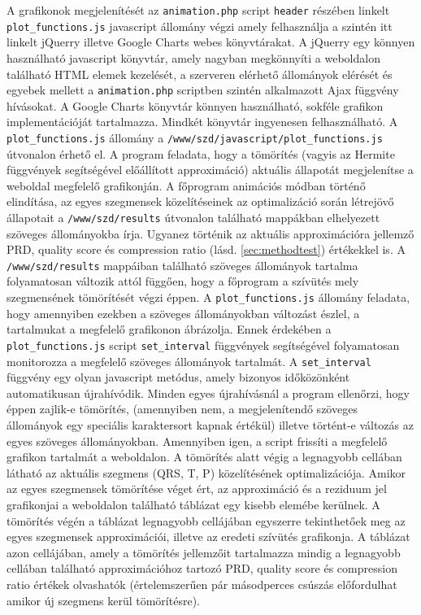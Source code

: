 \documentclass[oneside,titlepage,12pt,a4paper]{report}
\begin{document}
\par A grafikonok megjelenítését az \texttt{animation.php} script \texttt{header} részében linkelt \texttt{plot\_functions.js} javascript állomány végzi amely felhasználja a szintén itt linkelt jQuerry \cite{jquerry} illetve Google Charts \cite{gchart} webes könyvtárakat. A jQuerry egy könnyen használható javascript könyvtár, amely nagyban megkönnyíti a weboldalon található HTML elemek kezelését, a szerveren elérhető állományok elérését és egyebek mellett a \texttt{animation.php} scriptben szintén alkalmazott Ajax függvény hívásokat. A Google Charts könyvtár könnyen használható, sokféle grafikon implementációját tartalmazza. Mindkét könyvtár ingyenesen felhasználható. A \texttt{plot\_functions.js} állomány a \texttt{/www/szd/javascript/plot\_functions.js} útvonalon érhető el. A program feladata, hogy a tömörítés (vagyis az Hermite függvények segítségével előállított approximáció) aktuális állapotát megjelenítse a weboldal megfelelő grafikonján. A főprogram animációs módban történő elindítása, az egyes szegmensek közelítéseinek az optimalizáció során létrejövő állapotait a \texttt{/www/szd/results} útvonalon található mappákban elhelyezett szöveges állományokba írja. Ugyanez történik az aktuális approximációra jellemző PRD, quality score és compression ratio (lásd. \ref{sec:methodtest}) értékekkel is. A \texttt{/www/szd/results} mappáiban található szöveges állományok tartalma folyamatosan változik attól függően, hogy a főprogram a szívütés mely szegmensének tömörítését végzi éppen. A \texttt{plot\_functions.js} állomány feladata, hogy amennyiben ezekben a szöveges állományokban változást észlel, a tartalmukat  a megfelelő grafikonon ábrázolja. Ennek érdekében a \texttt{plot\_functions.js} script \texttt{set\_interval} függvények segítségével folyamatosan monitorozza a megfelelő szöveges állományok tartalmát. A \texttt{set\_interval} függvény egy olyan javascript metódus, amely bizonyos időközönként automatikusan újrahívódik. Minden egyes újrahívásnál a program ellenőrzi, hogy éppen zajlik-e tömörítés, (amennyiben nem, a megjelenítendő szöveges állományok egy speciális karaktersort kapnak értékül) illetve történt-e változás az egyes szöveges állományokban. Amennyiben igen, a script frissíti a megfelelő grafikon tartalmát a weboldalon. A tömörítés alatt végig a legnagyobb cellában látható az aktuális szegmens (QRS, T, P) közelítésének optimalizációja. Amikor az egyes szegmensek tömörítése véget ért, az approximáció és a reziduum jel grafikonjai a weboldalon található táblázat egy kisebb elemébe kerülnek. A tömörítés végén a táblázat legnagyobb cellájában egyszerre tekinthetőek meg az egyes szegmensek approximációi, illetve az eredeti szívütés grafikonja. A táblázat azon cellájában, amely a tömörítés jellemzőit tartalmazza mindig a legnagyobb cellában található approximációhoz tartozó PRD, quality score és compression ratio értékek olvashatók (értelemszerűen pár másodperces csúszás előfordulhat amikor új szegmens kerül tömörítésre). 
\end{document}
